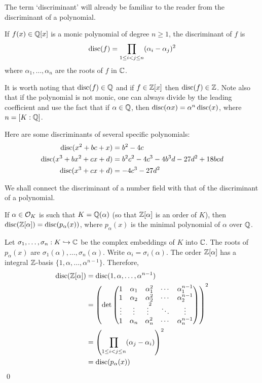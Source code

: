 The term `discriminant' will already be familiar to the reader from the discriminant of a polynomial. 

\begin{dfn}
If $f(x) \in \mathbb{Q}[x]$ is a monic polynomial of degree $n \geq 1$, the discriminant of $f$ is
	\[
	\operatorname{disc}(f)= \prod_{1 \leq i<j \leq n} (\alpha_i - \alpha_j)^2
	\]
where $\alpha_1,\ldots,\alpha_n$ are the roots of $f$ in $\mathbb{C}$. 
\end{dfn}

It is worth noting that $\operatorname{disc}(f) \in \mathbb{Q}$ and if $f \in \mathbb{Z}[x]$ then $\operatorname{disc}(f) \in \mathbb{Z}$. Note also that if the polynomial is not monic, one can always divide by the leading coefficient and use the fact that if $\alpha \in \mathbb{Q}$, then $\operatorname{disc}(\alpha x)= \alpha^n \operatorname{disc}(x)$, where $n=[K:\mathbb{Q}]$. 

\begin{ex}
Here are some discriminants of several specific polynomials:
	\[
	\begin{split}
	\operatorname{disc}(x^2+bc+x)&= b^2 - 4c \\
	\operatorname{disc}(x^3+bx^2+cx+d)&= b^2c^2 - 4c^3 - 4b^3d - 27d^2 + 18bcd \\
	\operatorname{disc}(x^3+cx+d)&= -4c^3 - 27 d^2
	\end{split}
	\] \xqed
\end{ex}

We shall connect the discriminant of a number field with that of the discriminant of a polynomial. 

\begin{lem}\label{lem:discmin}
If $\alpha \in \mathcal{O}_K$ is such that $K=\mathbb{Q}(\alpha)$ (so that $\mathbb{Z}[\alpha]$ is an order of $K$), then $\operatorname{disc}(\mathbb{Z}[\alpha])= \operatorname{disc}(p_\alpha(x))$, where $p_\alpha(x)$ is the minimal polynomial of $\alpha$ over $\mathbb{Q}$. 
\end{lem}

\pf Let $\sigma_1,\ldots,\sigma_n: K \hookrightarrow \mathbb{C}$ be the complex embeddings of $K$ into $\mathbb{C}$. The roots of $p_\alpha(x)$ are $\sigma_1(\alpha),\ldots,\sigma_n(\alpha)$. Write $\alpha_i= \sigma_i(\alpha)$. The order $\mathbb{Z}[\alpha]$ has a  integral $\mathbb{Z}$-basis $\{1,\alpha,\ldots,\alpha^{n-1}\}$. Therefore,
	\[
	\begin{split}
	\operatorname{disc}(\mathbb{Z}[\alpha])&= \operatorname{disc}(1,\alpha,\ldots,\alpha^{n-1}) \\
	&= \left( \det \begin{pmatrix}
	1 & \alpha_1 & \alpha_1^2 & \cdots & \alpha_1^{n-1} \\
	1 & \alpha_2 & \alpha_2^2 & \cdots & \alpha_2^{n-1} \\
	\vdots & \vdots & \vdots^2 & \ddots & \vdots \\
	1 & \alpha_n & \alpha_n^2 & \cdots & \alpha_n^{n-1} 
	\end{pmatrix} \right)^2 \\
	&= \left( \prod_{1 \leq i < j \leq n} (\alpha_j - \alpha_i) \right)^2 \\
	&= \operatorname{disc}(p_\alpha(x))
	\end{split}
	\] \qed \\

